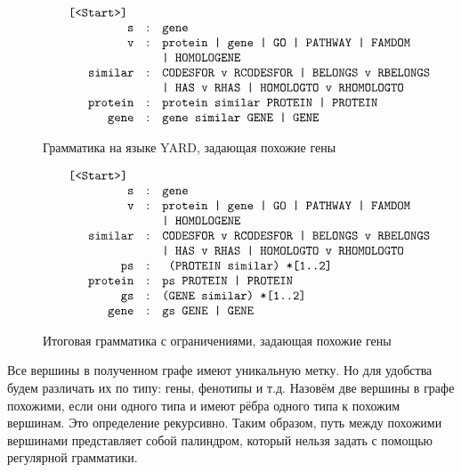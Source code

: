 \documentclass[14pt]{matmex-diploma}
\begin{document}
\begin{figure}
$$
\begin{array}{crcl}
&\mbox{\texttt{ [<Start>] }} \\
&\mbox{\texttt{s}} &:& \mbox{\texttt{gene }} \\
&\mbox{\texttt{v}} &:& \mbox{\texttt{protein | gene | GO | PATHWAY | FAMDOM}} \\
&&&\mbox{\texttt{| HOMOLOGENE}} \\
&\mbox{\texttt{similar}} &:& \mbox{\texttt{CODESFOR v RCODESFOR | BELONGS v RBELONGS}} \\
&&&\mbox{\texttt{| HAS v RHAS | HOMOLOGTO v RHOMOLOGTO}} \\
&\mbox{\texttt{protein}} & :& \mbox{\texttt{protein similar PROTEIN | PROTEIN}} \\
&\mbox{\texttt{gene}} & :& \mbox{\texttt{gene similar GENE | GENE}} \\
\end{array}
$$
\caption{Грамматика на языке YARD, задающая похожие гены}
\label{grammar}
\end{figure}

\begin{figure}
$$
\begin{array}{crcl}
&\mbox{\texttt{ [<Start>] }} \\
&\mbox{\texttt{s}} &:& \mbox{\texttt{gene }} \\
&\mbox{\texttt{v}} &:& \mbox{\texttt{protein | gene | GO | PATHWAY | FAMDOM}} \\
&&&\mbox{\texttt{| HOMOLOGENE}} \\
&\mbox{\texttt{similar}} &:& \mbox{\texttt{CODESFOR v RCODESFOR | BELONGS v RBELONGS}} \\
&&&\mbox{\texttt{| HAS v RHAS | HOMOLOGTO v RHOMOLOGTO}} \\
&\mbox{\texttt{ps}} & :& \mbox{\texttt{ (PROTEIN similar) *[1..2]}} \\
&\mbox{\texttt{protein}} & :& \mbox{\texttt{ps PROTEIN | PROTEIN}} \\
&\mbox{\texttt{gs}} & :& \mbox{\texttt{(GENE similar) *[1..2]}} \\
&\mbox{\texttt{gene}} & :& \mbox{\texttt{gs GENE | GENE}} \\
\end{array}
$$
\caption{Итоговая грамматика с ограничениями, задающая похожие гены}
\label{finalgrammar}
\end{figure}

Все вершины в полученном графе имеют уникальную метку. Но для удобства будем различать их по типу: гены, фенотипы и т.д. Назовём две вершины в графе похожими, если они одного типа и имеют рёбра одного типа к похожим вершинам. Это определение рекурсивно. Таким образом, путь между похожими вершинами представляет собой палиндром, который нельзя задать с помощью регулярной грамматики. 
\end{document}

